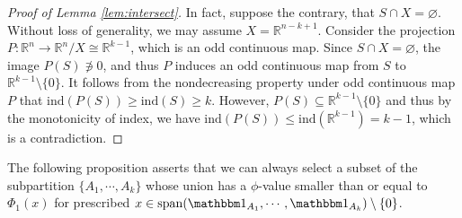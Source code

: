 \documentclass[12pt, reqno]{article}
\begin{document}
\begin{proof}[Proof of Lemma \ref{lem:intersect}]

In fact, suppose the contrary, that $S\cap X=\varnothing$. Without loss of generality, we may assume $X=\mathbb{R}^{n-k+1}$. Consider the projection $P:\mathbb{R}^n\to\mathbb{R}^n/X\cong \mathbb{R}^{k-1}$, which is an odd continuous map. Since $S\cap X=\varnothing$, the image $P(S)\not\ni0$, and thus $P$ induces an odd continuous map from $S$ to $\mathbb{R}^{k-1}\setminus\{0\}$. 
It follows from the nondecreasing property under odd continuous map $P$ that  $\mathrm{ind}(P(S))\ge \mathrm{ind}(S)\ge k$. However, $P(S)\subseteq \mathbb{R}^{k-1}\setminus\{0\}$ and thus by the monotonicity of index, we have $\mathrm{ind}(P(S))\le \mathrm{ind}(\mathbb{R}^{k-1})=k-1$, which is a contradiction. 
\end{proof}

The following proposition asserts that we can always select a subset of the subpartition $\{A_1,\cdots,A_k\}$ whose union has a $\phi$-value smaller than or equal to $\Phi_1(x)$ for prescribed $x\in \mathrm{span}(\mathbbm 1_{A_1},\cdots,\mathbbm 1_{A_{k}})\setminus\{0\}$.
 
\end{document}
